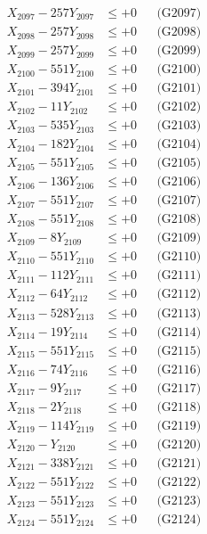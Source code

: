 \documentclass[a4paper,10pt]{article}
\begin{document}
{\begin{align}
X_{2097} - 257Y_{2097} &\leq +0 && \text{(G2097)} \\
X_{2098} - 257Y_{2098} &\leq +0 && \text{(G2098)} \\
X_{2099} - 257Y_{2099} &\leq +0 && \text{(G2099)} \\
X_{2100} - 551Y_{2100} &\leq +0 && \text{(G2100)} \\
\allowbreak
X_{2101} - 394Y_{2101} &\leq +0 && \text{(G2101)} \\
X_{2102} - 11Y_{2102} &\leq +0 && \text{(G2102)} \\
X_{2103} - 535Y_{2103} &\leq +0 && \text{(G2103)} \\
X_{2104} - 182Y_{2104} &\leq +0 && \text{(G2104)} \\
X_{2105} - 551Y_{2105} &\leq +0 && \text{(G2105)} \\
X_{2106} - 136Y_{2106} &\leq +0 && \text{(G2106)} \\
X_{2107} - 551Y_{2107} &\leq +0 && \text{(G2107)} \\
X_{2108} - 551Y_{2108} &\leq +0 && \text{(G2108)} \\
X_{2109} - 8Y_{2109} &\leq +0 && \text{(G2109)} \\
X_{2110} - 551Y_{2110} &\leq +0 && \text{(G2110)} \\
\allowbreak
X_{2111} - 112Y_{2111} &\leq +0 && \text{(G2111)} \\
X_{2112} - 64Y_{2112} &\leq +0 && \text{(G2112)} \\
X_{2113} - 528Y_{2113} &\leq +0 && \text{(G2113)} \\
X_{2114} - 19Y_{2114} &\leq +0 && \text{(G2114)} \\
X_{2115} - 551Y_{2115} &\leq +0 && \text{(G2115)} \\
X_{2116} - 74Y_{2116} &\leq +0 && \text{(G2116)} \\
X_{2117} - 9Y_{2117} &\leq +0 && \text{(G2117)} \\
X_{2118} - 2Y_{2118} &\leq +0 && \text{(G2118)} \\
X_{2119} - 114Y_{2119} &\leq +0 && \text{(G2119)} \\
X_{2120} - Y_{2120} &\leq +0 && \text{(G2120)} \\
\allowbreak
X_{2121} - 338Y_{2121} &\leq +0 && \text{(G2121)} \\
X_{2122} - 551Y_{2122} &\leq +0 && \text{(G2122)} \\
X_{2123} - 551Y_{2123} &\leq +0 && \text{(G2123)} \\
X_{2124} - 551Y_{2124} &\leq +0 && \text{(G2124)} \\

\end{align}}
\end{document}
